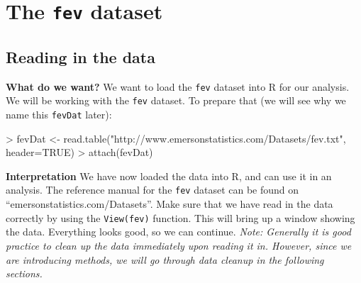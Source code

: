 \documentclass[landscape]{article}
\renewenvironment{Schunk}{\vspace{\topsep}}{\vspace{\topsep}}
\begin{document}
\section{The \texttt{fev} dataset}
\subsection{Reading in the data}
{\large \textbf{What do we want?}}
\newline \indent We want to load the \texttt{fev} dataset into R for our analysis.
\newline \indent 
We will be working with the \texttt{fev} dataset. To prepare that (we will see why we name this \texttt{fevDat} later):
\begin{Schunk}
\begin{Sinput}
> fevDat <- read.table("http://www.emersonstatistics.com/Datasets/fev.txt", header=TRUE)
> attach(fevDat)
\end{Sinput}
\end{Schunk}
{\large \textbf{Interpretation}}
\newline \indent We have now loaded the data into R, and can use it in an analysis.
The reference manual for the \texttt{fev} dataset can be found on ``emersonstatistics.com/Datasets''. Make sure that we have read in the data correctly by using the \texttt{View(fev)} function. This will bring up a window showing the data. Everything looks good, so we can continue. \emph{Note: Generally it is good practice to clean up the data immediately upon reading it in. However, since we are introducing methods, we will go through data cleanup in the following sections.} 
\end{document}
